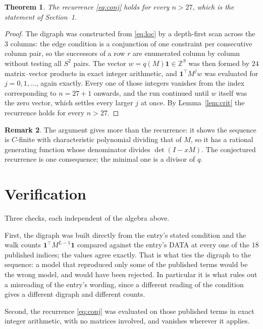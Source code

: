 \documentclass[11pt,a4paper]{article}
\theoremstyle{plain}
\newtheorem{theorem}{Theorem}
\theoremstyle{definition}
\newtheorem{remark}[theorem]{Remark}
\begin{document}
\begin{theorem}
The recurrence \eqref{eq:conj} holds for every $n>27$, which is the statement of
Section~1.
\end{theorem}

\begin{proof}
The digraph was constructed from \eqref{eq:loc} by a depth-first scan across the $3$
columns: the edge condition is a conjunction of one constraint per consecutive column
pair, so the successors of a row $r$ are enumerated column by column without testing all
$S^2$ pairs. The vector $w=q(M)\mathbf{1}\in\mathbb{Z}^{S}$ was then formed by $24$
matrix--vector products in exact integer arithmetic, and $\mathbf{1}^{\!\top}M^{j}w$ was
evaluated for $j=0,1,\dots$, again exactly. Every one of those integers vanishes from the
index corresponding to $n=27+1$ onwards, and the run continued until $w$ itself was the
zero vector, which settles every larger $j$ at once. By Lemma~\ref{lem:crit} the recurrence
holds for every $n>27$.
\end{proof}

\begin{remark}
The argument gives more than the recurrence: it shows the sequence is $C$-finite with
characteristic polynomial dividing that of $M$, so it has a rational generating function
whose denominator divides $\det(I-xM)$. The conjectured recurrence is one consequence; the
minimal one is a divisor of $q$.
\end{remark}

\section{Verification}

Three checks, each independent of the algebra above.

First, the digraph was built directly from the entry's stated condition and the walk counts
$\mathbf{1}^{\!\top}M^{L-1}\mathbf{1}$ compared against the entry's DATA at
every one of the $18$ published indices; the values agree exactly. That is what ties
the digraph to the sequence: a model that reproduced only some of the published terms would
be the wrong model, and would have been rejected. In particular it is what rules out a
misreading of the entry's wording, since a different reading of the condition gives a
different digraph and different counts.

Second, the recurrence \eqref{eq:conj} was evaluated on those published terms in exact
integer arithmetic, with no matrices involved, and vanishes wherever it applies.
\end{document}
